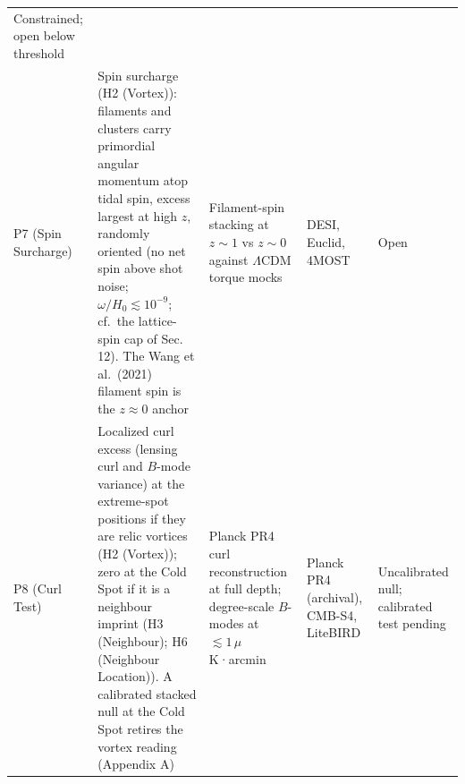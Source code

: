 \documentclass[
]{article}
\begin{document}
\begin{longtable}[]{@{}lllll@{}}
\begin{minipage}[t]{0.19\columnwidth}
Constrained; open below threshold\strut
\end{minipage}\tabularnewline
\begin{minipage}[t]{0.11\columnwidth}\raggedright
P7 (Spin Surcharge)\strut
\end{minipage} & \begin{minipage}[t]{0.19\columnwidth}\raggedright
Spin surcharge (H2 (Vortex)): filaments and clusters carry primordial
angular momentum atop tidal spin, excess largest at high \(z\), randomly
oriented (no net spin above shot noise; \(\omega/H_0 \lesssim 10^{-9}\);
cf.~the lattice-spin cap of Sec. 12). The Wang et al.~(2021) filament
spin is the \(z \approx 0\) anchor\strut
\end{minipage} & \begin{minipage}[t]{0.19\columnwidth}\raggedright
Filament-spin stacking at \(z \sim 1\) vs \(z \sim 0\) against
\(\Lambda\)CDM torque mocks\strut
\end{minipage} & \begin{minipage}[t]{0.19\columnwidth}\raggedright
DESI, Euclid, 4MOST\strut
\end{minipage} & \begin{minipage}[t]{0.19\columnwidth}\raggedright
Open\strut
\end{minipage}\tabularnewline
\begin{minipage}[t]{0.11\columnwidth}\raggedright
P8 (Curl Test)\strut
\end{minipage} & \begin{minipage}[t]{0.19\columnwidth}\raggedright
Localized curl excess (lensing curl and \(B\)-mode variance) at the
extreme-spot positions if they are relic vortices (H2 (Vortex)); zero at
the Cold Spot if it is a neighbour imprint (H3 (Neighbour); H6
(Neighbour Location)). A calibrated stacked null at the Cold Spot
retires the vortex reading (Appendix A)\strut
\end{minipage} & \begin{minipage}[t]{0.19\columnwidth}\raggedright
Planck PR4 curl reconstruction at full depth; degree-scale \(B\)-modes
at \(\lesssim 1\,\mu\)K·arcmin\strut
\end{minipage} & \begin{minipage}[t]{0.19\columnwidth}\raggedright
Planck PR4 (archival), CMB-S4, LiteBIRD\strut
\end{minipage} & \begin{minipage}[t]{0.19\columnwidth}\raggedright
Uncalibrated null; calibrated test pending\strut
\end{minipage}\tabularnewline

\end{longtable}
\end{document}
